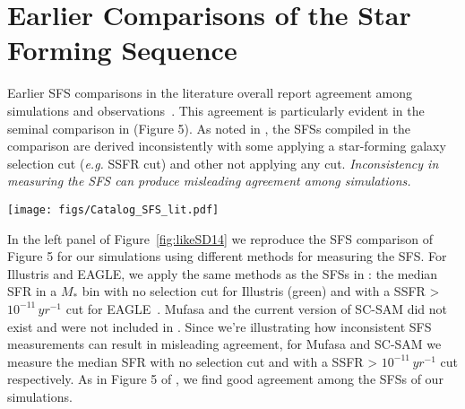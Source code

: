 \documentclass[preprint2,tighten]{aastex62}
\begin{document}
\section{Earlier Comparisons of the Star Forming Sequence} \label{app:literature}
Earlier SFS comparisons in the literature overall report agreement among 
simulations and observations~\citep[\emph{e.g.}][]{genel2014, somerville2015, sparre2015, schaye2015, bluck2016, dave2016}. 
This agreement is particularly evident in the seminal comparison in 
\cite{somerville2015b} (Figure 5). As noted in \cite{somerville2015b}, 
the SFSs compiled in the comparison are derived inconsistently with some 
applying a star-forming galaxy selection cut (\emph{e.g.} SSFR cut) and 
other not applying any cut. {\em Inconsistency in measuring the SFS can 
produce misleading agreement among simulations.} 

\begin{figure*}
\begin{center}
\texttt{[image: figs/Catalog\_SFS\_lit.pdf]} 
\caption{The SFSs of Illustris, EAGLE, {\sc Mufasa}, and SC-SAM central 
galaxies, where we measure the SFSs using multiple methods as in Figure 5 
of \cite{somerville2015b} (left panel) and using the same method (right panel). 
In the left panel, we measure the SFSs by taking the median SFR in 
a $M_*$ bin with no selection cuts for Illustris and {\sc Mufasa}
and by taking the median SFR after a SSFR > $10^{-11}\,yr^{-1}$ cut 
for EAGLE and SC-SAM. In the right panel, we measure the SFSs by taking 
the median SFR after a SSFR > $10^{-11}\,yr^{-1}$ cut for all four simulations.
The difference between the two panels illustrate that \emph{the agreement 
found in the left panel, and similarly in \cite{somerville2015b},
is mainly driven by the difference in methods used to measure SFSs.}
} 
\label{fig:likeSD14}
\end{center}
\end{figure*}

In the left panel of Figure~\ref{fig:likeSD14} we reproduce the SFS comparison of 
\cite{somerville2015b} Figure 5 for our simulations using different methods for measuring the SFS. 
For Illustris and EAGLE, we apply the same methods as the SFSs in \cite{somerville2015b}: 
the median SFR in a $M_*$ bin with no selection cut for Illustris (green) and 
with a SSFR > $10^{-11}\,yr^{-1}$ cut for EAGLE~\citep[red][]{schaye2015}. 
{\sc Mufasa} and the current version of SC-SAM did not exist and were not 
included in \cite{somerville2015b}. Since we're illustrating how inconsistent 
SFS measurements can result in misleading agreement, for {\sc Mufasa} and 
SC-SAM we measure the median SFR with no selection cut and with a SSFR > 
$10^{-11}\,yr^{-1}$ cut respectively. As in Figure 5 of \cite{somerville2015b}, 
we find good agreement among the SFSs of our simulations. 
\end{document}
